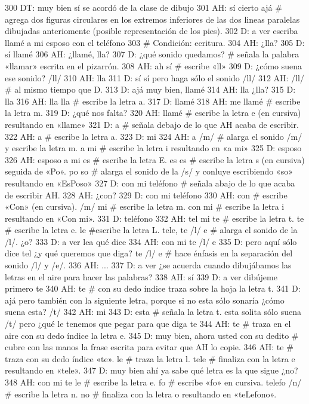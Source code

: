 300 DT: muy bien sí se acordó de la clase de dibujo
301 AH: sí cierto ajá # agrega dos figuras circulares en los extremos inferiores de las dos lineas paralelas dibujadas anteriomente (posible representación de los pies).
302 D: a ver escriba llamé a mi esposo con el teléfono
303 # Condición: ecritura.
304 AH: ¿lla?
305 D: sí llamé
306 AH: ¿llamé, lla?
307 D: ¿qué sonido quedamos? # señala la palabra «llamar» escrita en el pizarrón.
308 AH: ah sí # escribe «ll»
309 D: ¿cómo suena ese sonido? /ll/
310 AH: lla
311 D: sí sí pero haga sólo el sonido /ll/
312 AH: /ll/ # al mismo tiempo que D.
313 D: ajá muy bien, llamé
314 AH: lla ¿lla?
315 D: lla
316 AH: lla lla # escribe la letra a.
317 D: llamé
318 AH: me llamé # escribe la letra m.
319 D: ¿qué nos falta?
320 AH: llamé # escribe la letra e (en cursiva) resultando en «llame»
321 D: a # señala debajo de lo que AH acaba de escribir.
322 AH: a # escribe la letra a.
323 D: mi
324 AH: a /m/ # alarga el sonido /m/ y escribe la letra m. a mi # escribe la letra i resultando en «a mi»
325 D: esposo
326 AH: esposo a mi es # escribe la letra E. es es # escribe la letra s (en cursiva) seguida de «Po». po so # alarga el sonido de la /s/ y conluye escribiendo «so» resultando en «EsPoso»
327 D: con mi teléfono # señala abajo de lo que acaba de escribir AH.
328 AH: ¿con?
329 D: con mi teléfono
330 AH: con # escribe «Con» (en cursiva). /m/ mi # escribe la letra m. con mi # escribe la letra i resultando en «Con mi».
331 D: teléfono
332 AH: tel mi te # escribe la letra t. te # escribe la letra e. le #escribe la letra L. tele, te /l/ e # alarga el sonido de la /l/. ¿o?
333 D: a ver lea qué dice
334 AH: con mi te /l/ e
335 D: pero aquí sólo dice tel ¿y qué queremos que diga? te /l/ e # hace énfasis en la separación del sonido /l/ y /e/.
336 AH: ...
337 D: a ver ¿se acuerda cuando dibujábamos las letras en el aire para hacer las palabras?
338 AH: sí
339 D: a ver dibújeme primero te
340 AH: te # con su dedo índice traza sobre la hoja la letra t.
341 D: ajá pero también con la siguiente letra, porque si no esta sólo sonaría ¿cómo suena esta? /t/
342 AH: mi
343 D: esta # señala la letra t. esta solita sólo suena /t/ pero ¿qué le tenemos que pegar para que diga te
344 AH: te # traza en el aire con su dedo índice la letra e.
345 D: muy bien, ahora usted con su dedito # cubre con las manos la frase escrita para evitar que AH lo copie.
346 AH: te # traza con su dedo índice «te». le # traza la letra l. tele # finaliza con la letra e resultando en «tele».
347 D: muy bien ahí ya sabe qué letra es la que sigue ¿no?
348 AH: con mi te le # escribe la letra e. fo # escribe «fo» en cursiva. telefo /n/ # escribe la letra n. no # finaliza con la letra o resultando en «teLefono».
